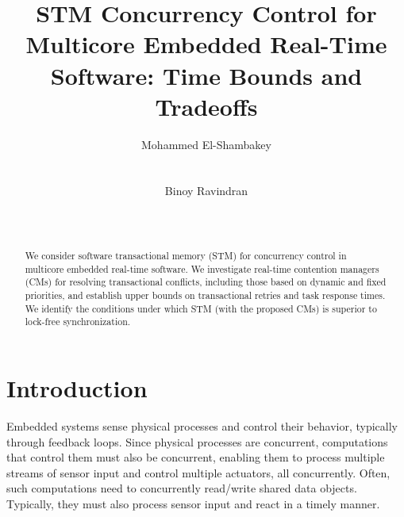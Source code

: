 \documentclass[letter]{sig-alternate}
\begin{document}

\title{STM Concurrency Control for Multicore Embedded Real-Time Software: Time Bounds and Tradeoffs%
}


\author{
\alignauthor Mohammed El-Shambakey\\
\\
\\
\alignauthor Binoy Ravindran\\
\\
\\
}

\maketitle

\begin{abstract}
We consider software transactional memory (STM) for concurrency control in multicore embedded real-time software. We investigate real-time contention managers (CMs) for resolving transactional conflicts, including those based on dynamic and fixed priorities, and establish upper bounds on transactional retries and task response times. We identify the conditions under which STM (with the proposed CMs) is superior to lock-free synchronization. 

\end{abstract}



\section{Introduction}
\label{sec:intro}

Embedded systems sense physical processes and control their behavior, typically through feedback loops. Since physical processes are concurrent, computations that control them must also be concurrent, enabling them to process multiple streams of sensor input and control multiple actuators, all concurrently. Often, such computations need to concurrently read/write shared data objects. Typically, they must also process sensor input and react in a timely manner. 
\end{document}
